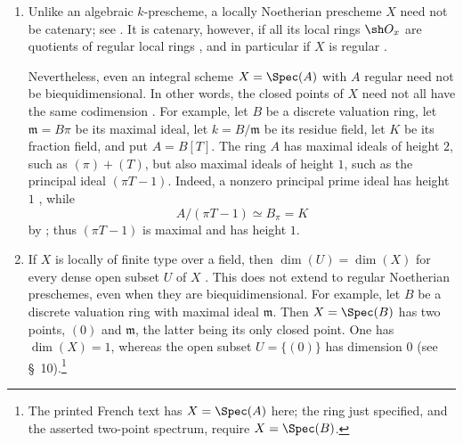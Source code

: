 \begin{remarks}[5.2.5]
\label{IV.5.2.5}
\begin{enumerate}[{\rm(i)}]
\item
{}
\label{IV.5.2.5.i}
Unlike an algebraic $k$-prescheme, a locally Noetherian prescheme
$X$ need not be catenary; see .
It is catenary, however, if all its local rings $\sh O_x$ are
quotients of regular local rings , and in
particular if $X$ is regular .

Nevertheless, even an integral scheme $X=\Spec(A)$ with $A$ regular
need not be biequidimensional.
In other words, the closed points of $X$ need not all have the same
codimension .
For example, let $B$ be a discrete valuation ring, let
$\mathfrak m=B\pi$ be its maximal ideal, let
$k=B/\mathfrak m$ be its residue field, let $K$ be its fraction
field, and put $A=B[T]$.
The ring $A$ has maximal ideals of height $2$, such as
$(\pi)+(T)$, but also maximal ideals of height $1$, such as the
principal ideal $(\pi T-1)$.
Indeed, a nonzero principal prime ideal has height $1$
, while
\[
A/(\pi T-1)\simeq B_\pi=K
\]
by ; thus $(\pi T-1)$ is maximal and has height $1$.

\item
{}
\label{IV.5.2.5.ii}
If $X$ is locally of finite type over a field, then
$\dim(U)=\dim(X)$ for every dense open subset $U$ of $X$
.
This does not extend to regular Noetherian preschemes, even when they
are biequidimensional.
For example, let $B$ be a discrete valuation ring with maximal ideal
$\mathfrak m$.
Then $X=\Spec(B)$ has two points, $(0)$ and $\mathfrak m$, the latter
being its only closed point.
One has $\dim(X)=1$, whereas the open subset $U=\{(0)\}$ has
dimension $0$ (see \S~10).\footnote{The printed French text has
$X=\Spec(A)$ here; the ring just specified, and the asserted
two-point spectrum, require $X=\Spec(B)$.}
\end{enumerate}
\end{remarks}
